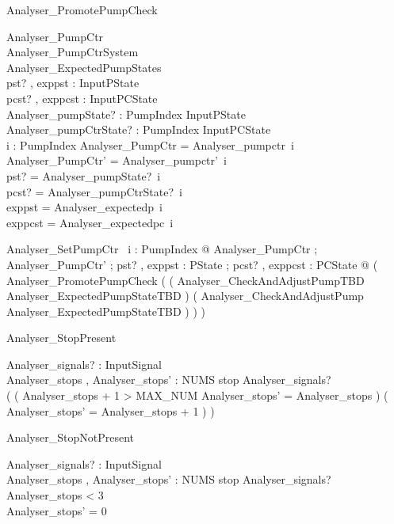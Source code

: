 \documentclass{article}
\begin{document}
\begin{schema}{Analyser\_PromotePumpCheck}

 \Delta Analyser\_PumpCtr \\
 \Delta Analyser\_PumpCtrSystem \\
 Analyser\_ExpectedPumpStates \\
 pst? , exppst : InputPState \\
 pcst? , exppcst : InputPCState \\
 Analyser\_pumpState? : PumpIndex \fun InputPState \\
 Analyser\_pumpCtrState? : PumpIndex \fun InputPCState \\
 i : PumpIndex 
\where
 \theta Analyser\_PumpCtr = Analyser\_pumpctr~i \\
 \theta Analyser\_PumpCtr' = Analyser\_pumpctr'~i \\
 pst? = Analyser\_pumpState?~i \\
 pcst? = Analyser\_pumpCtrState?~i \\
 exppst = Analyser\_expectedp~i \\
 exppcst = Analyser\_expectedpc~i
\end{schema}

\begin{zed}
	Analyser\_SetPumpCtr ~\forall i : PumpIndex @ \exists Analyser\_PumpCtr ; Analyser\_PumpCtr' ; pst? , exppst : PState ; pcst? , exppcst : PCState @ ( Analyser\_PromotePumpCheck \land ( ( Analyser\_CheckAndAdjustPumpTBD \land Analyser\_ExpectedPumpStateTBD ) \lor ( Analyser\_CheckAndAdjustPump \land \lnot Analyser\_ExpectedPumpStateTBD ) ) )
\end{zed}

\begin{schema}{Analyser\_StopPresent}

 Analyser\_signals? : \power InputSignal \\
 Analyser\_stops , Analyser\_stops' : NUMS 
\where
 stop \in Analyser\_signals? \\
 ( ( Analyser\_stops + 1 > MAX\_NUM \land Analyser\_stops' = Analyser\_stops ) \lor ( Analyser\_stops' = Analyser\_stops + 1 ) )
\end{schema}

\begin{schema}{Analyser\_StopNotPresent}

 Analyser\_signals? : \power InputSignal \\
 Analyser\_stops , Analyser\_stops' : NUMS 
\where
 stop \notin Analyser\_signals? \land Analyser\_stops < 3 \\
 Analyser\_stops' = 0
\end{schema}
\end{document}
